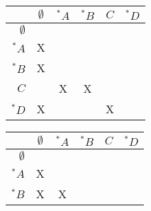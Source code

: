 \documentclass[docid=2017/18]{tcom_exam}
\begin{document}
{\begin{center}
\end{center}
\begin{minipage}[c]{0.49\textwidth}
	\begin{center}
		\begin{tabular}{r || c | c | c | c | c}
						& $\emptyset$ & $^* A$ & $^* B$ & $C$ & $^* D$ \\ \hline \hline
			$\emptyset$ & \cellcolor{gray} & \cellcolor{gray}    & \cellcolor{gray}    & \cellcolor{gray}    & \cellcolor{gray}    \\ \hline
			$     ^* A$ & X           & \cellcolor{gray}    & \cellcolor{gray}    & \cellcolor{gray}    & \cellcolor{gray}    \\ \hline
			$     ^* B$ & X           &     &  \cellcolor{gray}   & \cellcolor{gray}    & \cellcolor{gray}    \\ \hline
			$        C$ &             & X   & X   & \cellcolor{gray}    & \cellcolor{gray}    \\ \hline
			$     ^* D$ & X           &     &     & X   & \cellcolor{gray}    
		\end{tabular}
	\end{center}
\end{minipage}
\begin{minipage}[c]{0.49\textwidth}
	\begin{center}
		\begin{tabular}{r || c | c | c | c | c}
						& $\emptyset$ & $^* A$ & $^* B$ & $C$ & $^* D$ \\ \hline \hline
			$\emptyset$ & \cellcolor{gray} & \cellcolor{gray}    & \cellcolor{gray}    & \cellcolor{gray}    & \cellcolor{gray}    \\ \hline
			$     ^* A$ & X           & \cellcolor{gray}    & \cellcolor{gray}    & \cellcolor{gray}    & \cellcolor{gray}    \\ \hline
			$     ^* B$ & X           & X   &  \cellcolor{gray}   & \cellcolor{gray}    & \cellcolor{gray}    \\ \hline

\end{tabular}
\end{center}
\end{minipage}}
\end{document}
